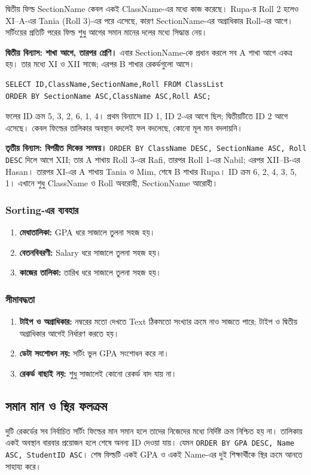 দ্বিতীয় ফিল্ড SectionName কেবল একই ClassName-এর মধ্যে কাজ করেছে। Rupa-র Roll 2 হলেও XI--A-এর Tania (Roll 3)-এর পরে এসেছে, কারণ SectionName-এর অগ্রাধিকার Roll-এর আগে। সর্টিংয়ের প্রতিটি পরের ফিল্ড শুধু আগের সমান মানের দলের মধ্যে সিদ্ধান্ত নেয়।

\textbf{দ্বিতীয় বিন্যাস: শাখা আগে, তারপর শ্রেণি।} এবার SectionName-কে প্রধান করলে সব A শাখা আগে একত্র হয়। তার মধ্যে XI ও XII সাজে; এরপর B শাখার রেকর্ডগুলো আসে।
\begin{verbatim}
SELECT ID,ClassName,SectionName,Roll FROM ClassList
ORDER BY SectionName ASC,ClassName ASC,Roll ASC;
\end{verbatim}
ফলের ID ক্রম 5, 3, 2, 6, 1, 4। প্রথম বিন্যাসে ID 1, ID 2-এর আগে ছিল; দ্বিতীয়টিতে ID 2 আগে এসেছে। কেবল ফিল্ডের তালিকার অবস্থান বদলেই ফল বদলেছে, কোনো মূল মান বদলায়নি।

\textbf{তৃতীয় বিন্যাস: বিপরীত দিকের সমন্বয়।} \texttt{ORDER BY ClassName DESC, SectionName ASC, Roll DESC} দিলে আগে XII; তার A শাখায় Roll 3-এর Rafi, তারপর Roll 1-এর Nabil; এরপর XII--B-এর Hasan। তারপর XI-এর A শাখায় Tania ও Mim, শেষে B শাখার Rupa। ID ক্রম 6, 2, 4, 3, 5, 1। এখানে শুধু ClassName ও Roll অবরোহী, SectionName আরোহী।


\subsubsection{Sorting-এর ব্যবহার}
\begin{enumerate}
\item \textbf{মেধাতালিকা:} GPA ধরে সাজালে তুলনা সহজ হয়।
\item \textbf{বেতনবিবরণী:} Salary ধরে সাজালে তুলনা সহজ হয়।
\item \textbf{কাজের তালিকা:} তারিখ ধরে সাজালে তুলনা সহজ হয়।
\end{enumerate}
\subsubsection{সীমাবদ্ধতা}
\begin{enumerate}
\item \textbf{টাইপ ও অগ্রাধিকার:} নম্বরের মতো দেখতে Text ঠিকমতো সংখ্যার ক্রমে নাও সাজতে পারে; টাইপ ও দ্বিতীয় অগ্রাধিকার আগেই নির্ধারণ করতে হয়।
\item \textbf{ডেটা সংশোধন নয়:} সর্টিং ভুল GPA সংশোধন করে না।
\item \textbf{রেকর্ড বাছাই নয়:} শুধু সাজালেই কোনো রেকর্ড বাদ যায় না।
\end{enumerate}

\subsection{সমান মান ও স্থির ফলক্রম}
দুটি রেকর্ডের সব নির্বাচিত সর্টিং ফিল্ডের মান সমান হলে তাদের নিজেদের মধ্যে নির্দিষ্ট ক্রম নিশ্চিত হয় না। তালিকায় একই অবস্থান বারবার প্রয়োজন হলে শেষে অনন্য ID দেওয়া যায়। যেমন \texttt{ORDER BY GPA DESC, Name ASC, StudentID ASC}। শেষ ফিল্ডটি একই GPA ও একই Name-এর দুই শিক্ষার্থীকে স্থির ক্রমে আনতে সাহায্য করে।

